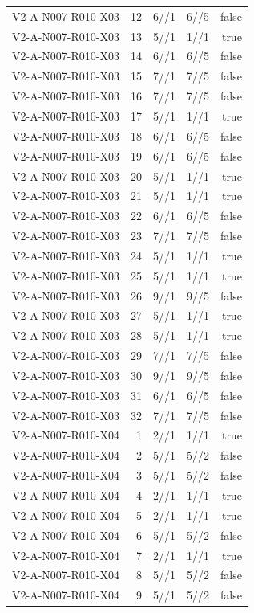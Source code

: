 {\begin{longtable}{lrrrr}
V2-A-N007-R010-X03 & 12 & 6//1 & 6//5 & false \\
V2-A-N007-R010-X03 & 13 & 5//1 & 1//1 & true \\
V2-A-N007-R010-X03 & 14 & 6//1 & 6//5 & false \\
V2-A-N007-R010-X03 & 15 & 7//1 & 7//5 & false \\
V2-A-N007-R010-X03 & 16 & 7//1 & 7//5 & false \\
V2-A-N007-R010-X03 & 17 & 5//1 & 1//1 & true \\
V2-A-N007-R010-X03 & 18 & 6//1 & 6//5 & false \\
V2-A-N007-R010-X03 & 19 & 6//1 & 6//5 & false \\
V2-A-N007-R010-X03 & 20 & 5//1 & 1//1 & true \\
V2-A-N007-R010-X03 & 21 & 5//1 & 1//1 & true \\
V2-A-N007-R010-X03 & 22 & 6//1 & 6//5 & false \\
V2-A-N007-R010-X03 & 23 & 7//1 & 7//5 & false \\
V2-A-N007-R010-X03 & 24 & 5//1 & 1//1 & true \\
V2-A-N007-R010-X03 & 25 & 5//1 & 1//1 & true \\
V2-A-N007-R010-X03 & 26 & 9//1 & 9//5 & false \\
V2-A-N007-R010-X03 & 27 & 5//1 & 1//1 & true \\
V2-A-N007-R010-X03 & 28 & 5//1 & 1//1 & true \\
V2-A-N007-R010-X03 & 29 & 7//1 & 7//5 & false \\
V2-A-N007-R010-X03 & 30 & 9//1 & 9//5 & false \\
V2-A-N007-R010-X03 & 31 & 6//1 & 6//5 & false \\
V2-A-N007-R010-X03 & 32 & 7//1 & 7//5 & false \\
V2-A-N007-R010-X04 & 1 & 2//1 & 1//1 & true \\
V2-A-N007-R010-X04 & 2 & 5//1 & 5//2 & false \\
V2-A-N007-R010-X04 & 3 & 5//1 & 5//2 & false \\
V2-A-N007-R010-X04 & 4 & 2//1 & 1//1 & true \\
V2-A-N007-R010-X04 & 5 & 2//1 & 1//1 & true \\
V2-A-N007-R010-X04 & 6 & 5//1 & 5//2 & false \\
V2-A-N007-R010-X04 & 7 & 2//1 & 1//1 & true \\
V2-A-N007-R010-X04 & 8 & 5//1 & 5//2 & false \\
V2-A-N007-R010-X04 & 9 & 5//1 & 5//2 & false \\

\end{longtable}}
